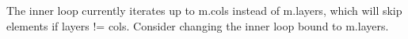 
\begin{DoxyRefList}
\item[Member \mbox{\hyperlink{Matrix3D_8h_ac70368dfe3aa451e212fd480abd176f6}{mat3\+D\+\_\+fill}} (\mbox{\hyperlink{structMat3D}{Mat3D}} m, float x)]\label{bug__bug000001}%
%
The inner loop currently iterates up to m.\+cols instead of m.\+layers, which will skip elements if layers != cols. Consider changing the inner loop bound to m.\+layers. 
\end{DoxyRefList}